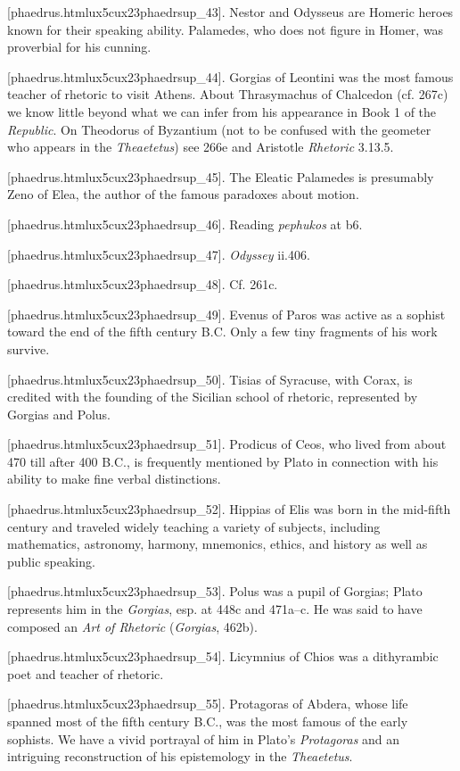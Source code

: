 [phaedrus.htmlux5cux23phaedrsup_43]. Nestor and Odysseus are
Homeric heroes known for their speaking ability. Palamedes, who does not
figure in Homer, was proverbial for his cunning.

[phaedrus.htmlux5cux23phaedrsup_44]. Gorgias of Leontini was
the most famous teacher of rhetoric to visit Athens. About Thrasymachus
of Chalcedon (cf. 267c) we know little beyond what we can infer from his
appearance in Book 1 of the {\em Republic}. On Theodorus of Byzantium
(not to be confused with the geometer who appears in the
{\em Theaetetus}) see 266e and Aristotle {\em Rhetoric} 3.13.5.

[phaedrus.htmlux5cux23phaedrsup_45]. The Eleatic Palamedes is
presumably Zeno of Elea, the author of the famous paradoxes about
motion.

[phaedrus.htmlux5cux23phaedrsup_46]. Reading {\em pephukos} at
b6.

[phaedrus.htmlux5cux23phaedrsup_47]. {\em Odyssey} ii.406.

[phaedrus.htmlux5cux23phaedrsup_48]. Cf. 261c.

[phaedrus.htmlux5cux23phaedrsup_49]. Evenus of Paros was active
as a sophist toward the end of the fifth century B.C. Only a few tiny
fragments of his work survive.

[phaedrus.htmlux5cux23phaedrsup_50]. Tisias of Syracuse, with
Corax, is credited with the founding of the Sicilian school of rhetoric,
represented by Gorgias and Polus.

[phaedrus.htmlux5cux23phaedrsup_51]. Prodicus of Ceos, who
lived from about 470 till after 400 B.C., is frequently mentioned by
Plato in connection with his ability to make fine verbal distinctions.

[phaedrus.htmlux5cux23phaedrsup_52]. Hippias of Elis was born
in the mid-fifth century and traveled widely teaching a variety of
subjects, including mathematics, astronomy, harmony, mnemonics, ethics,
and history as well as public speaking.

[phaedrus.htmlux5cux23phaedrsup_53]. Polus was a pupil of
Gorgias; Plato represents him in the {\em Gorgias}, esp. at 448c and
471a--c. He was said to have composed an {\em Art of Rhetoric}
({\em Gorgias}, 462b).

[phaedrus.htmlux5cux23phaedrsup_54]. Licymnius of Chios was a
dithyrambic poet and teacher of rhetoric.

[phaedrus.htmlux5cux23phaedrsup_55]. Protagoras of Abdera,
whose life spanned most of the fifth century B.C., was the most famous
of the early sophists. We have a vivid portrayal of him in Plato's
{\em Protagoras} and an intriguing reconstruction of his epistemology in
the {\em Theaetetus}.

